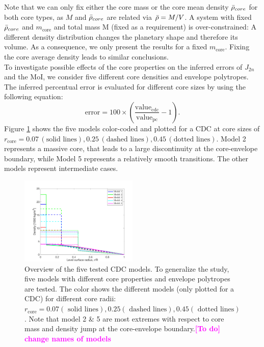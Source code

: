 \documentclass[usenatbib]{mnras}
\newcommand{\TD}[1]{\textcolor{magenta}{\bf [To do] #1}}
\newcommand{\sub}[1]{_{\text{#1}}}
\begin{document}
Note that we can only fix either the core mass or the core mean density $\Bar{\rho}_{core}$ for both core types, as $M$ and $\Bar{\rho}_{core}$ are related via $\Bar{\rho} = M/V$. 
A system with fixed $\Bar{\rho}_{core}$ and $m\sub{core}$ and total mass M (fixed as a requirement) is over-constrained: A different density distribution changes the planetary shape and therefore its volume. As a consequence, we only present the results for a fixed $m\sub{core}$. Fixing the core average density leads to similar conclusions. \\
To investigate possible effects of the core properties on the inferred errors of $J_{2n}$ and the MoI, we consider five different core densities and envelope polytropes. \\ 
The inferred percentual error is evaluated for different core sizes by using the following equation: 
\begin{equation}
    \text{error} = 100\times \left( \frac{\text{value}_\text{cdc}}{\text{value}_\text{pc}}-1 \right).
    \label{eq:error}
\end{equation}
Figure \ref{fig:Model_comparison} shows the five models color-coded and plotted for a CDC at core sizes of $r\sub{core} = 0.07\, (\text{solid lines}), 0.25\, (\text{dashed lines}), 0.45\, (\text{dotted lines})$. Model 2 represents a massive core, that leads to a large discontinuity at the core-envelope boundary, while Model 5 represents a relatively smooth transitions. The other models represent intermediate cases.

\begin{figure}
    \centering
    \includegraphics[width = 0.5\textwidth]{Figures/Model_comparison.png}
    \caption{Overview of the five tested CDC models. To generalize the study, five models with different core properties and envelope polytropes are tested. The color shows the different models (only plotted for a CDC) for different core radii: $r\sub{core} = 0.07 (\text{ solid lines}), 0.25 (\text{ dashed lines}), 0.45 (\text{ dotted lines})$. Note that model 2 \& 5 are most extremes with respect to core mass and density jump at the core-envelope boundary.\TD{change names of models}}
    \label{fig:Model_comparison}
\end{figure}
\end{document}
